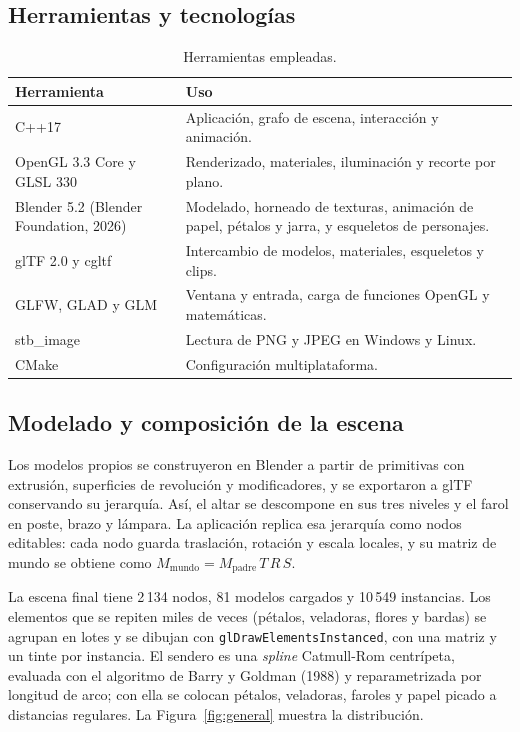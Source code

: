 \documentclass[letter,12pt]{article}
\begin{document}
	\subsection{Herramientas y tecnologías}
	\begin{table}[H]
		\centering
		\small
		\begin{tabularx}{\textwidth}{p{4.0cm}X}
			\toprule
			\textbf{Herramienta} & \textbf{Uso}\\
			\midrule
			C++17 & Aplicación, grafo de escena, interacción y animación. \\
			OpenGL 3.3 Core y GLSL 330 & Renderizado, materiales, iluminación y recorte por plano. \\
			Blender 5.2 (Blender Foundation, 2026) & Modelado, horneado de texturas, animación de papel, pétalos y jarra, y esqueletos de personajes. \\
			glTF 2.0 y cgltf & Intercambio de modelos, materiales, esqueletos y clips. \\
			GLFW, GLAD y GLM & Ventana y entrada, carga de funciones OpenGL y matemáticas. \\
			stb\_image & Lectura de PNG y JPEG en Windows y Linux. \\
			CMake & Configuración multiplataforma. \\
			\bottomrule
		\end{tabularx}
		\caption{Herramientas empleadas.}
		\label{tab:herramientas}
	\end{table}

	\subsection{Modelado y composición de la escena}
	Los modelos propios se construyeron en Blender a partir de primitivas con extrusión, superficies de revolución y modificadores, y se exportaron a glTF conservando su jerarquía. Así, el altar se descompone en sus tres niveles y el farol en poste, brazo y lámpara. La aplicación replica esa jerarquía como nodos editables: cada nodo guarda traslación, rotación y escala locales, y su matriz de mundo se obtiene como $M_{\text{mundo}} = M_{\text{padre}}\, T\, R\, S$.

	La escena final tiene 2\,134 nodos, 81 modelos cargados y 10\,549 instancias. Los elementos que se repiten miles de veces (pétalos, veladoras, flores y bardas) se agrupan en lotes y se dibujan con \texttt{glDrawElementsInstanced}, con una matriz y un tinte por instancia. El sendero es una \textit{spline} Catmull-Rom centrípeta, evaluada con el algoritmo de Barry y Goldman (1988) y reparametrizada por longitud de arco; con ella se colocan pétalos, veladoras, faroles y papel picado a distancias regulares. La Figura~\ref{fig:general} muestra la distribución.
\end{document}
